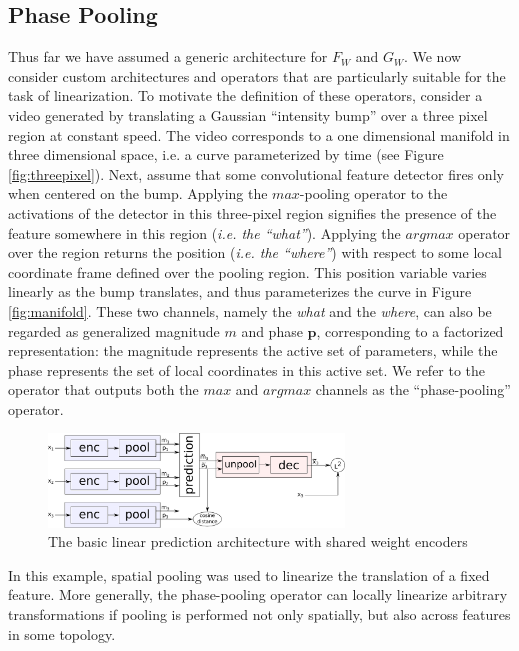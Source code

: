 \documentclass{article} %
\begin{document}
\subsection{Phase Pooling} 
\label{subsec:phase pooling} 
Thus far we have assumed a generic architecture for $F_W$ and $G_W$. We now consider custom architectures and operators that are particularly suitable for the task of linearization. To motivate the definition of these operators, consider a video generated by translating a Gaussian ``intensity bump'' over a three pixel region at constant speed. The video corresponds to a one dimensional manifold in three dimensional space, i.e. a curve parameterized by time (see Figure \ref{fig:threepixel}). Next, assume that some convolutional feature detector fires only when centered on the bump.
Applying the $max$-pooling operator to the activations of the detector in this three-pixel region signifies the presence of the feature somewhere in this region (\emph{i.e. the ``what''}). Applying the $argmax$ operator over the region returns the position (\emph{i.e. the ``where''}) with respect to some local coordinate frame defined over the pooling region. This position variable varies linearly as the bump translates, and thus parameterizes the curve in Figure \ref{fig:manifold}. These two channels, namely the \emph{what} and the \emph{where}, can also be regarded as generalized magnitude $m$ and phase $\mathbf p$, corresponding to a factorized representation: the magnitude represents the active set of parameters, while the phase represents the set of local coordinates in this active set.
 We refer to the operator that outputs both the $max$ and $argmax$ channels as the ``phase-pooling'' operator.

\begin{figure}
  \centering
   \includegraphics[width=0.7\textwidth]{./figures/network.pdf}
   \caption{The basic linear prediction architecture with shared weight encoders}
   \label{fig:arch1}
\end{figure}

In this example, spatial pooling was used to linearize the translation of a fixed feature. More generally, the phase-pooling operator can locally linearize arbitrary transformations if pooling is performed not only spatially, but also across features in some topology.
\end{document}
